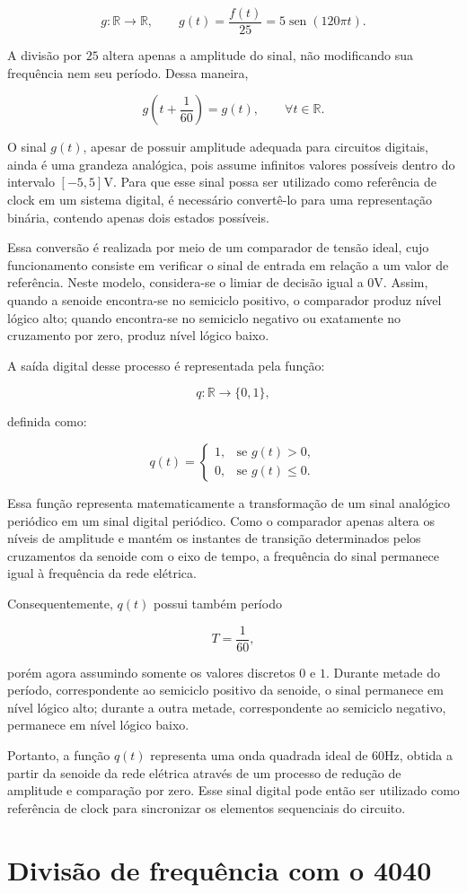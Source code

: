 \documentclass[a4paper,12pt]{article}
\DeclareMathOperator{\sen}{sen}
\begin{document}
\[
g:\mathbb{R}\to\mathbb{R}, \qquad
g(t)=\frac{f(t)}{25}=5\sen(120\pi t).
\]

A divisão por \(25\) altera apenas a amplitude do sinal, não modificando sua frequência nem seu período. Dessa maneira,

\[
g\left(t+\frac{1}{60}\right)=g(t), \qquad \forall t\in\mathbb{R}.
\]

O sinal \(g(t)\), apesar de possuir amplitude adequada para circuitos digitais, ainda é uma grandeza analógica, pois assume infinitos valores possíveis dentro do intervalo \([-5,5]\)V. Para que esse sinal possa ser utilizado como referência de clock em um sistema digital, é necessário convertê-lo para uma representação binária, contendo apenas dois estados possíveis.

Essa conversão é realizada por meio de um comparador de tensão ideal, cujo funcionamento consiste em verificar o sinal de entrada em relação a um valor de referência. Neste modelo, considera-se o limiar de decisão igual a \(0\)V. Assim, quando a senoide encontra-se no semiciclo positivo, o comparador produz nível lógico alto; quando encontra-se no semiciclo negativo ou exatamente no cruzamento por zero, produz nível lógico baixo.

A saída digital desse processo é representada pela função:

\[
q:\mathbb{R}\to\{0,1\},
\]

definida como:

\[
q(t)=
\begin{cases}
1, & \text{se } g(t)>0,\\
0, & \text{se } g(t)\leq0.
\end{cases}
\]

Essa função representa matematicamente a transformação de um sinal analógico periódico em um sinal digital periódico. Como o comparador apenas altera os níveis de amplitude e mantém os instantes de transição determinados pelos cruzamentos da senoide com o eixo de tempo, a frequência do sinal permanece igual à frequência da rede elétrica.

Consequentemente, \(q(t)\) possui também período

\[
T=\frac{1}{60},
\]

porém agora assumindo somente os valores discretos \(0\) e \(1\). Durante metade do período, correspondente ao semiciclo positivo da senoide, o sinal permanece em nível lógico alto; durante a outra metade, correspondente ao semiciclo negativo, permanece em nível lógico baixo.

Portanto, a função \(q(t)\) representa uma onda quadrada ideal de \(60\)Hz, obtida a partir da senoide da rede elétrica através de um processo de redução de amplitude e comparação por zero. Esse sinal digital pode então ser utilizado como referência de clock para sincronizar os elementos sequenciais do circuito.


\section{Divisão de frequência com o 4040}
\section{}
\end{document}
